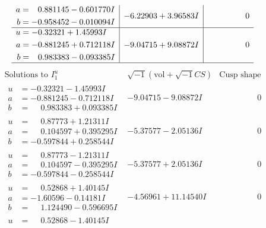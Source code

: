 \documentclass[1p]{elsarticle_modified}
\theoremstyle{definition}
\newcommand{\I}{\sqrt{-1}}
\begin{document}
$$\begin{array}{c|c|c}
\begin{aligned}
a &= \phantom{-}0.881145 - 0.601770 I \\
b &= -0.958452 - 0.010094 I\end{aligned}
 & -6.22903 + 3.96583 I & \phantom{-0.000000 } 0 \\ \hline\begin{aligned}
u &= -0.32321 + 1.45993 I \\
a &= -0.881245 + 0.712118 I \\
b &= \phantom{-}0.983383 - 0.093385 I\end{aligned}
 & -9.04715 + 9.08872 I & \phantom{-0.000000 } 0\\
 \hline 
 \end{array}$$\newpage$$\begin{array}{c|c|c}  
\text{Solutions to }I^u_{1}& \I (\text{vol} + \sqrt{-1}CS) & \text{Cusp shape}\\
 \hline 
\begin{aligned}
u &= -0.32321 - 1.45993 I \\
a &= -0.881245 - 0.712118 I \\
b &= \phantom{-}0.983383 + 0.093385 I\end{aligned}
 & -9.04715 - 9.08872 I & \phantom{-0.000000 } 0 \\ \hline\begin{aligned}
u &= \phantom{-}0.87773 + 1.21311 I \\
a &= \phantom{-}0.104597 + 0.395295 I \\
b &= -0.597844 + 0.258544 I\end{aligned}
 & -5.37577 - 2.05136 I & \phantom{-0.000000 } 0 \\ \hline\begin{aligned}
u &= \phantom{-}0.87773 - 1.21311 I \\
a &= \phantom{-}0.104597 - 0.395295 I \\
b &= -0.597844 - 0.258544 I\end{aligned}
 & -5.37577 + 2.05136 I & \phantom{-0.000000 } 0 \\ \hline\begin{aligned}
u &= \phantom{-}0.52868 + 1.40145 I \\
a &= -1.60596 - 0.14181 I \\
b &= \phantom{-}1.124490 - 0.596695 I\end{aligned}
 & -4.56961 + 11.14540 I & \phantom{-0.000000 } 0 \\ \hline\begin{aligned}
u &= \phantom{-}0.52868 - 1.40145 I \\

\end{aligned}
\end{array}$$
\end{document}

